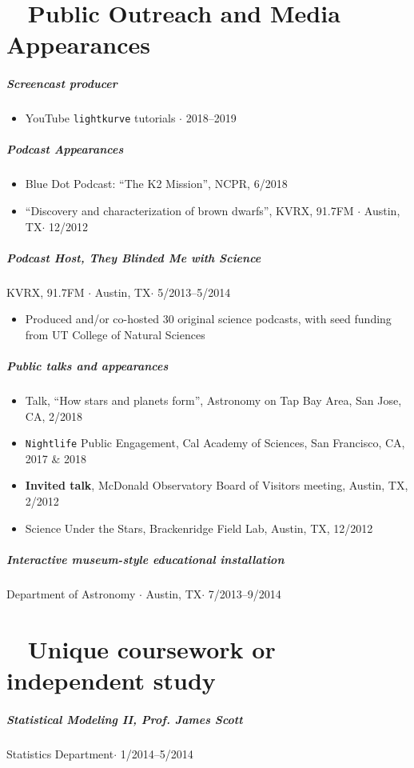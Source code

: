 \documentclass[10pt,letterpaper]{article}
\begin{document}
\section*{\faYoutube ~ Public Outreach and Media Appearances}

\subparagraph{Screencast producer}
\begin{itemize}
    \item YouTube \texttt{lightkurve} tutorials $\cdot$ 2018--2019
\end{itemize}


\subparagraph{Podcast Appearances}
\begin{itemize}
    \item Blue Dot Podcast: ``The K2 Mission'', NCPR, 6/2018
    \item ``Discovery and characterization of brown dwarfs'', KVRX, 91.7FM $\cdot$ Austin, TX$\cdot$ 12/2012
\end{itemize}

\subparagraph{Podcast Host, \emph{They Blinded Me with Science} }
KVRX, 91.7FM $\cdot$ Austin, TX$\cdot$ 5/2013--5/2014
\begin{itemize}
    \item Produced and/or co-hosted 30 original science podcasts, with seed funding from UT College of Natural Sciences
\end{itemize}

\subparagraph{Public talks and appearances}
\begin{itemize}
    \item Talk, ``How stars and planets form'', Astronomy on Tap Bay Area, San Jose, CA, 2/2018
    \item \texttt{Nightlife} Public Engagement, Cal Academy of Sciences, San Francisco, CA, 2017 \& 2018
    \item \textbf{Invited talk}, McDonald Observatory Board of Visitors meeting, Austin, TX, 2/2012
    \item Science Under the Stars, Brackenridge Field Lab, Austin, TX, 12/2012
\end{itemize}

\subparagraph{Interactive museum-style educational installation}
Department of Astronomy $\cdot$ Austin, TX$\cdot$ 7/2013--9/2014

\section*{ \faSuperscript ~ Unique coursework or independent study}

\subparagraph{Statistical Modeling II, Prof. James Scott}
Statistics Department$\cdot$ 1/2014--5/2014
\end{document}
